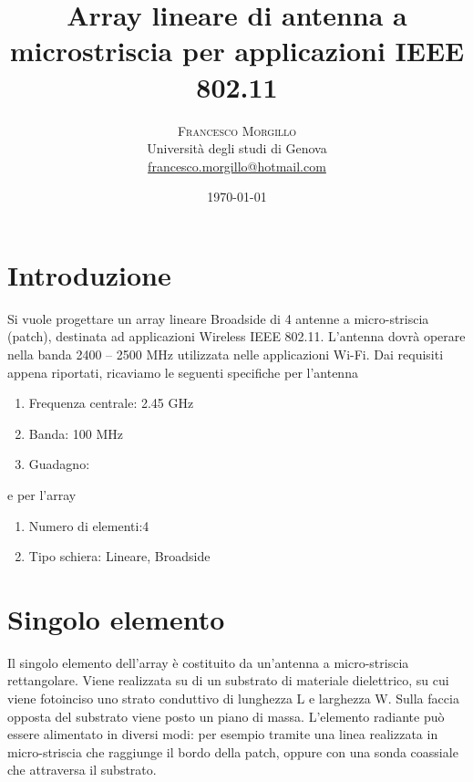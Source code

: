 \documentclass[twoside,twocolumn]{article}
\title{Array lineare di antenna a microstriscia per applicazioni IEEE 802.11} %
\author{%
\textsc{Francesco Morgillo}\\[1ex] %
\normalsize Università degli studi di Genova \\ %
\normalsize \href{mailto:francesco.morgillo@hotmail.com}{francesco.morgillo@hotmail.com} %
}
\date{\today} %
\begin{document}
\maketitle


\section{Introduzione}


Si vuole progettare un array lineare Broadside di 4 antenne a micro-striscia (patch), destinata ad applicazioni Wireless IEEE 802.11.
L'antenna dovrà operare nella banda 2400 – 2500 MHz utilizzata nelle applicazioni Wi-Fi.
Dai requisiti appena riportati, ricaviamo le seguenti specifiche per l'antenna

\begin{enumerate}[noitemsep] %
\item Frequenza centrale: 2.45 GHz
\item Banda: 100 MHz
\item Guadagno:  
\end{enumerate}
 e per l'array
 \begin{enumerate}[noitemsep] %
\item Numero di elementi:4 
\item Tipo schiera: Lineare, Broadside
\end{enumerate}



\section{Singolo elemento}
Il singolo elemento dell'array è costituito da un'antenna a micro-striscia rettangolare.
Viene realizzata su di un substrato di materiale dielettrico, su cui viene fotoinciso uno strato conduttivo di lunghezza L e larghezza W. Sulla faccia opposta del substrato viene posto un piano di massa. L'elemento radiante può essere alimentato in diversi modi: per esempio tramite una linea realizzata in micro-striscia che raggiunge il bordo della patch, oppure con una sonda coassiale che attraversa il substrato.
\end{document}
